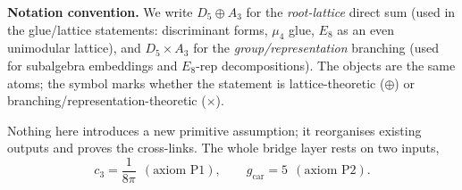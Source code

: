 \documentclass[11pt,a4paper]{article}
\newcommand{\gcar}{g_{\mathrm{car}}}
\newcommand{\cthree}{c_3}
\theoremstyle{definition}
\begin{document}
\noindent\textbf{Notation convention.} We write $D_5\oplus A_3$ for the \emph{root-lattice} direct sum
(used in the glue/lattice statements: discriminant forms, $\mu_4$ glue, $E_8$ as an even unimodular
lattice), and $D_5\times A_3$ for the \emph{group/representation} branching (used for subalgebra
embeddings and $E_8$-rep decompositions). The objects are the same atoms; the symbol marks whether the
statement is lattice-theoretic ($\oplus$) or branching/representation-theoretic ($\times$).

\smallskip
\noindent Nothing here introduces a new primitive assumption; it reorganises existing outputs and
proves the cross-links. The whole bridge layer rests on two inputs,
\begin{equation}
  \boxed{\ \cthree=\frac{1}{8\pi}\ \ (\text{axiom P1}),\qquad \gcar=5\ \ (\text{axiom P2}).\ }
\end{equation}
\end{document}

